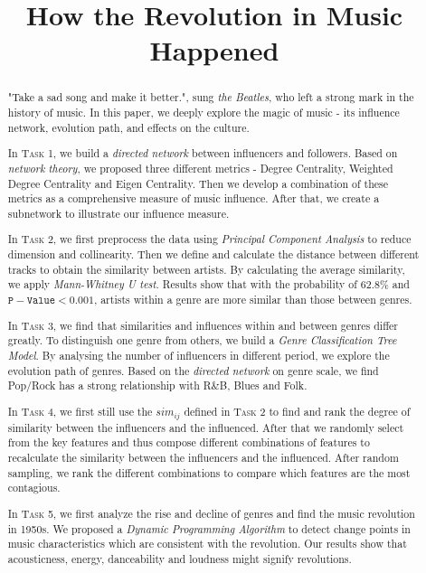 \documentclass[12pt]{article}  %
\title{How the Revolution in Music Happened}  %
\begin{document}
	
	\begin{abstract}
		
		"Take a sad song and make it better.", sung \textit{the Beatles}, who left a strong mark in the history of music. In this paper, we deeply explore the magic of music - its influence network, evolution path, and effects on the culture.
		
		In \textsc{Task 1}, we build a \textit{directed network} between influencers and followers. Based on \textit{network theory}, we proposed three different metrics - Degree Centrality, Weighted Degree Centrality and Eigen Centrality. Then we develop a combination of these metrics as a comprehensive measure of music influence. After that, we create a subnetwork to illustrate our influence measure.
		
		In \textsc{Task 2}, we first preprocess the data using \textit{Principal Component Analysis} to reduce dimension and collinearity. Then we define and calculate the distance between different tracks to obtain the similarity between artists. By calculating the average similarity, we apply \textit{Mann-Whitney U test}. Results show that with the probability of 62.8\% and $\mathtt{P-Value} < 0.001$, artists within a genre are more similar than those between genres.
		
		In \textsc{Task 3}, we find that similarities and influences within and between genres differ greatly. To distinguish one genre from others, we build a \textit{Genre Classification Tree Model}. By analysing the number of influencers in different period, we explore the evolution path of genres. Based on the \textit{directed network} on genre scale, we find Pop/Rock has a strong relationship with R\&B, Blues and Folk.
		
		In \textsc{Task 4}, we first still use the $ sim_{ij} $ defined in \textsc{Task 2} to find and rank the degree of similarity between the influencers and the influenced. After that we randomly select from the key features and thus compose different combinations of features to recalculate the similarity between the influencers and the influenced. After random sampling, we rank the different combinations to compare which features are the most contagious. 
		
		In \textsc{Task 5}, we first analyze the rise and decline of genres and find the music revolution in 1950s. We proposed a \textit{Dynamic Programming Algorithm} to detect change points in music characteristics which are consistent with the revolution. Our results show that acousticness, energy, danceability and loudness might signify revolutions.
		

\end{abstract}
\end{document}
